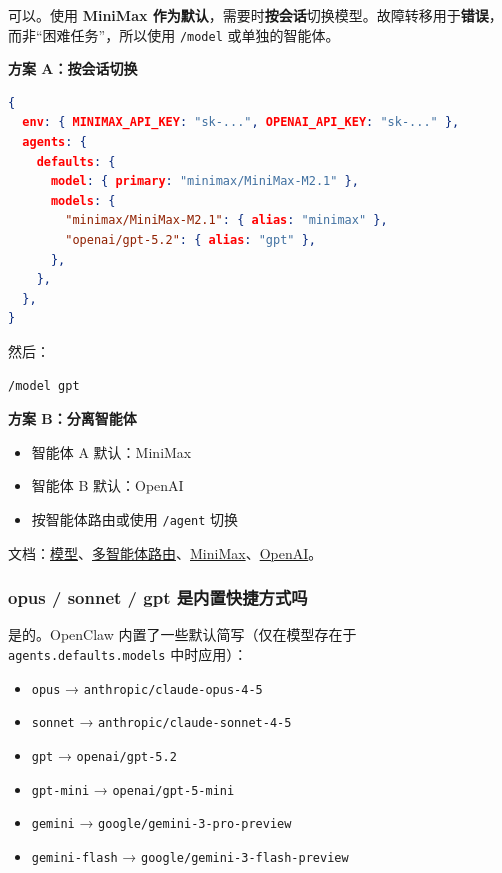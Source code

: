 可以。使用 \textbf{MiniMax 作为默认}，需要时\textbf{按会话}切换模型。故障转移用于\textbf{错误}，而非“困难任务”，所以使用 \texttt{/model} 或单独的智能体。

\textbf{方案 A：按会话切换}

\begin{lstlisting}[language=json]
{
  env: { MINIMAX_API_KEY: "sk-...", OPENAI_API_KEY: "sk-..." },
  agents: {
    defaults: {
      model: { primary: "minimax/MiniMax-M2.1" },
      models: {
        "minimax/MiniMax-M2.1": { alias: "minimax" },
        "openai/gpt-5.2": { alias: "gpt" },
      },
    },
  },
}
\end{lstlisting}


然后：

\begin{lstlisting}
/model gpt
\end{lstlisting}


\textbf{方案 B：分离智能体}

\begin{itemize}
  \item 智能体 A 默认：MiniMax
  \item 智能体 B 默认：OpenAI
  \item 按智能体路由或使用 \texttt{/agent} 切换
\end{itemize}


文档：\href{/concepts/models}{模型}、\href{/concepts/multi-agent}{多智能体路由}、\href{/providers/minimax}{MiniMax}、\href{/providers/openai}{OpenAI}。

\subsubsection{opus / sonnet / gpt 是内置快捷方式吗}


是的。OpenClaw 内置了一些默认简写（仅在模型存在于 \texttt{agents.defaults.models} 中时应用）：

\begin{itemize}
  \item \texttt{opus} → \texttt{anthropic/claude-opus-4-5}
  \item \texttt{sonnet} → \texttt{anthropic/claude-sonnet-4-5}
  \item \texttt{gpt} → \texttt{openai/gpt-5.2}
  \item \texttt{gpt-mini} → \texttt{openai/gpt-5-mini}
  \item \texttt{gemini} → \texttt{google/gemini-3-pro-preview}
  \item \texttt{gemini-flash} → \texttt{google/gemini-3-flash-preview}
\end{itemize}


